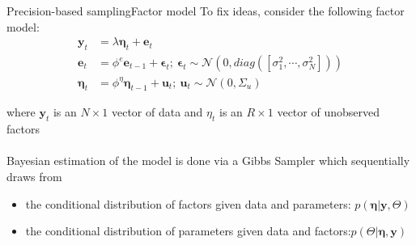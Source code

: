 \documentclass[xcolor=svgnames, 10pt, aspectratio=169]{beamer}
\begin{document}
\begin{frame}{Precision-based sampling}{Factor model}
    To fix ideas, consider the following factor model:
    \begin{align*}
        \mathbf{y}_t &= \lambda \boldsymbol{\eta}_t + \mathbf{e}_t \\
        \mathbf{e}_t &= \phi^{e} \mathbf{e}_{t-1} + \boldsymbol{\epsilon}_t;\: \boldsymbol{\epsilon}_t \sim \mathcal{N}(0, diag([\sigma^2_1, \cdots, \sigma^2_N])) \\
        \boldsymbol{\eta}_t &= \phi^{\eta} \boldsymbol{\eta}_{t-1} + \mathbf{u}_t;\: \mathbf{u}_t \sim \mathcal{N}(0, \Sigma_u)
    \end{align*}

    where $\mathbf{y}_t$ is an $N\times 1$ vector of data and $\eta_t$ is an $R\times 1$ vector of unobserved factors \\~\\

    Bayesian estimation of the model is done via a Gibbs Sampler which sequentially draws from \vspace{0.2cm}
    \begin{itemize}
        \item the conditional distribution of factors given data and parameters: $p(\boldsymbol{\eta} | \mathbf{y}, \Theta)$ 
        \item the conditional distribution of parameters given data and factors:$p(\Theta | \boldsymbol{\eta}, \mathbf{y})$
    \end{itemize}


\end{frame}
\end{document}
